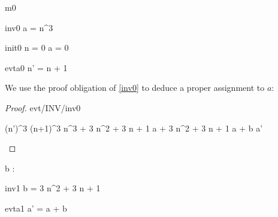 \documentclass[12pt]{amsart}
\title{}
\author{}
\date{} %
\begin{document}
\maketitle
\tableofcontents


\begin{machine}{m0}


\begin{invariant}{inv0}
	a = n^3
\end{invariant}
%


%
\begin{initialization}{init0}
	n = 0 \land a = 0
\end{initialization}
%
%
\begin{evassignment}{evt}{a0}
	n' = n + 1
\end{evassignment}

We use the proof obligation of \ref{inv0} to deduce a proper assignment to $a$:

\begin{proof}{evt/INV/inv0}
	\begin{calculation}
		(n')^3
	\hint{=}{ \ref{a0} }
		(n+1)^3
		n^3 + 3 \cdot n^2 + 3 \cdot n + 1
	\hint{=}{ \ref{inv0} }
		a + 3 \cdot n^2 + 3 \cdot n + 1
		a + b
	\hint{=}{ \ref{a1} }
		a'
	\end{calculation}
\end{proof}

\begin{variable}
	b : \Int
\end{variable}

\begin{invariant}{inv1}
	b = 3 \cdot n^2 + 3 \cdot n + 1
\end{invariant}
\begin{evassignment}{evt}{a1}
	a' = a + b
\end{evassignment}


\end{machine}
\end{document}
